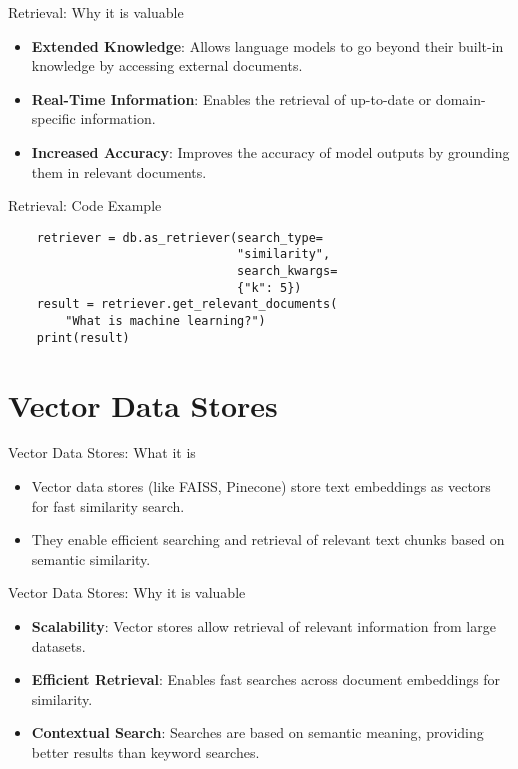 \documentclass{beamer}
\begin{document}
\begin{frame}{Retrieval: Why it is valuable}
    \begin{itemize}
        \item \textbf{Extended Knowledge}: Allows language models to go beyond their built-in knowledge by accessing external documents.
        \item \textbf{Real-Time Information}: Enables the retrieval of up-to-date or domain-specific information.
        \item \textbf{Increased Accuracy}: Improves the accuracy of model outputs by grounding them in relevant documents.
    \end{itemize}
\end{frame}

\begin{frame}[fragile]{Retrieval: Code Example}
    \begin{verbatim}
    retriever = db.as_retriever(search_type=
                                "similarity",
                                search_kwargs=
                                {"k": 5})
    result = retriever.get_relevant_documents(
        "What is machine learning?")
    print(result)
    \end{verbatim}
\end{frame}

\section{Vector Data Stores}

\begin{frame}{Vector Data Stores: What it is}
    \begin{itemize}
        \item Vector data stores (like FAISS, Pinecone) store text embeddings as vectors for fast similarity search.
        \item They enable efficient searching and retrieval of relevant text chunks based on semantic similarity.
    \end{itemize}
\end{frame}

\begin{frame}{Vector Data Stores: Why it is valuable}
    \begin{itemize}
        \item \textbf{Scalability}: Vector stores allow retrieval of relevant information from large datasets.
        \item \textbf{Efficient Retrieval}: Enables fast searches across document embeddings for similarity.
        \item \textbf{Contextual Search}: Searches are based on semantic meaning, providing better results than keyword searches.
    \end{itemize}
\end{frame}
\end{document}

